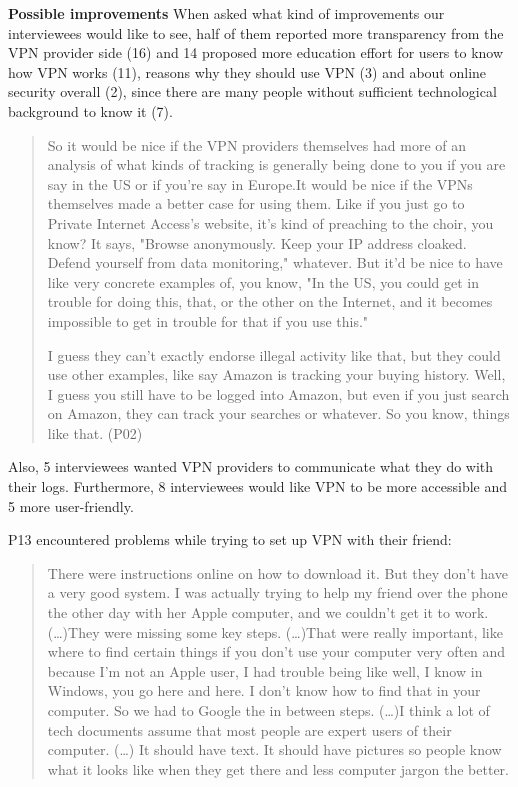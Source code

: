 \textbf{Possible improvements}
When asked what kind of improvements our interviewees would like to see, half of them reported more transparency from the VPN provider side (16) and 14 proposed more education effort for users to know how VPN works (11), reasons why they should use VPN (3) and about online security overall (2), since there are many people without sufficient technological background to know it (7). 

\begin{quote}So it would be nice if the VPN providers themselves had more of an analysis of what kinds of tracking is generally being done to you if you are say in the US or if you're say in Europe.It would be nice if the VPNs themselves made a better case for using them. Like if you just go to Private Internet Access's website, it's kind of preaching to the choir, you know? It says, "Browse anonymously. Keep your IP address cloaked. Defend yourself from data monitoring," whatever. But it'd be nice to have like very concrete examples of, you know, "In the US, you could get in trouble for doing this, that, or the other on the Internet, and it becomes impossible to get in trouble for that if you use this."

I guess they can't exactly endorse illegal activity like that, but they could use other examples, like say Amazon is tracking your buying history. Well, I guess you still have to be logged into Amazon, but even if you just search on Amazon, they can track your searches or whatever. So you know, things like that. (P02)\end{quote}


Also, 5 interviewees wanted VPN providers to communicate what they do with their logs. Furthermore, 8 interviewees would like VPN to be more accessible and 5 more user-friendly. 

P13 encountered problems while trying to set up VPN with their friend:
\begin{quote}There were instructions online on how to download it. But they don't have a very good system. I was actually trying to help my friend over the phone the other day with her Apple computer, and we couldn't get it to work. (\dots)They were missing some key steps. (\dots)That were really important, like where to find certain things if you don't use your computer very often and because I'm not an Apple user, I had trouble being like well, I know in Windows, you go here and here. I don't know how to find that in your computer. So we had to Google the in between steps. (\dots)I think a lot of tech documents assume that most people are expert users of their computer. (\dots) It should have text. It should have pictures so people know what it looks like when they get there and less computer jargon the better.\end{quote}

